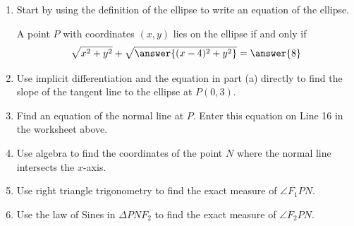 \documentclass{ximera}
\begin{document}
\begin{question}
\begin{enumerate}
\item Start by using the definition of the ellipse to write an equation of the ellipse.

A point $P$ with coordinates $(x,y)$ lies on the ellipse if and only if
\[
    \sqrt{x^2 + y^2} + \sqrt{\answer{(x-4)^2 + y^2}} = \answer{8}
\]

\item Use implicit differentiation and the equation in part (a) directly to find the slope of the tangent line to the ellipse at $P(0,3)$.

\item Find an equation of the normal line at $P$. Enter this equation on Line 16 in the worksheet above. 

\item Use algebra to find the coordinates of the point $N$ where the normal line intersects the $x$-axis.

\item Use right triangle trigonometry to find the exact measure of $\angle F_1 P N$.

\item Use the law of Sines in $\Delta PNF_2$ to find the exact measure of $\angle F_2PN$.




\end{enumerate}
\end{question}
\end{document}
